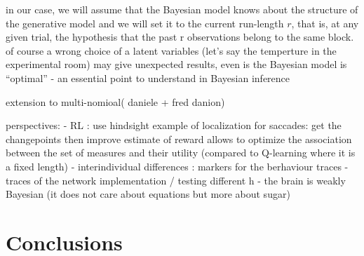 \documentclass[12pt,english]{article}%
\newcommand{\citep}[1]{\parencite{#1}}
\begin{document}
in our case, we will assume that the Bayesian model knows about the structure of the generative model and we will set it to the current run-length $r$, that is, at any given trial, the hypothesis that the past r observations belong to the same block. of course a wrong choice of a latent variables (let's say the temperture in the experimental room) may give unexpected results, even is the Bayesian model is ``optimal'' - an essential point to understand in Bayesian inference

extension to multi-nomioal( daniele + fred danion)





perspectives:
- RL : use hindsight example of localization for saccades: get the changepoints then improve estimate of reward allows to optimize the association between the set of measures and their utility (compared to Q-learning where it is a fixed length)
- interindividual differences : markers for the berhaviour traces - traces of the network implementation / testing different h
- the brain is weakly Bayesian (it does not care about equations but more about sugar)



\section{Conclusions}
\end{document}
